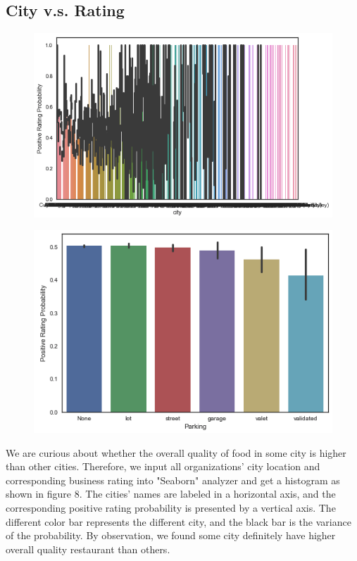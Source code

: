 \documentclass{article}
\begin{document}
\subsection{City v.s. Rating}
\begin{figure}[t]
\centering
\begin{minipage}{.5\textwidth}
  \centering
  \includegraphics[width=\linewidth]{CityR.png}
  \label{fig:test1}
\end{minipage}%
\begin{minipage}{.5\textwidth}
  \centering
  \includegraphics[width=\linewidth]{Parking.png}
  \label{fig:test2}
\end{minipage}
\end{figure}
We are curious about whether the overall quality of food in some city is higher than other cities. Therefore, we input all organizations' city location and corresponding business rating into "Seaborn" analyzer and get a histogram as shown in figure 8. The cities' names are labeled in a horizontal axis, and the corresponding positive rating probability is presented by a vertical axis. The different color bar represents the different city, and the black bar is the variance of the probability. By observation, we found some city definitely have higher overall quality restaurant than others.
\end{document}
